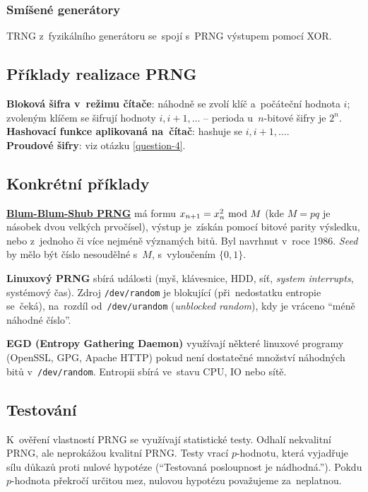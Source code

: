 \subsubsection*{Smíšené generátory}

TRNG z~fyzikálního generátoru se~spojí s~PRNG výstupem pomocí XOR.

\subsection{Příklady realizace PRNG}

\textbf{Bloková šifra v~režimu čítače}: náhodně se zvolí klíč a~počáteční hodnota $i$; zvoleným klíčem se šifrují hodnoty $i, i+1, \dots$ -- perioda u~$n$-bitové šifry je $2^n$. \\
\textbf{Hashovací funkce aplikovaná na~čítač}: hashuje se $i, i+1, \dots$. \\
\textbf{Proudové šifry}: viz otázku \ref{question-4}.

\subsection{Konkrétní příklady}

\textbf{\href{https://en.wikipedia.org/wiki/Blum_Blum_Shub}{Blum-Blum-Shub PRNG}} má formu $x_{n+1} = x_n^2 \ \mathrm{mod}\ M$ (kde $M = pq$ je násobek dvou velkých prvočísel), výstup je~získán pomocí bitové parity výsledku, nebo z~jednoho či více nejméně významých bitů. Byl navrhnut v~roce 1986. \emph{Seed} by mělo být číslo nesoudělné s~$M$, s~vyloučením $\{0, 1\}$.

\textbf{Linuxový PRNG} sbírá události (myš, klávesnice, HDD, síť, \emph{system interrupts}, systémový čas). Zdroj \texttt{/dev/random} je blokující (při~nedostatku entropie se~čeká), na~rozdíl od~\texttt{/dev/urandom} (\emph{unblocked random}), kdy je vráceno \enquote{méně náhodné číslo}.

\textbf{EGD (Entropy Gathering Daemon)} využívají některé linuxové programy (OpenSSL, GPG, Apache HTTP) pokud není dostatečné množství náhodných bitů v~\texttt{/dev/random}. Entropii sbírá ve~stavu CPU, IO nebo sítě.

\subsection{Testování}

K~ověření vlastností PRNG se využívají statistické testy. Odhalí nekvalitní PRNG, ale neprokážou kvalitní PRNG. Testy vrací $p$-hodnotu, která vyjadřuje sílu důkazů proti nulové hypotéze (\enquote{Testovaná posloupnost je nádhodná.}). Pokdu $p$-hodnota překročí určitou mez, nulovou hypotézu považujeme za~neplatnou.


